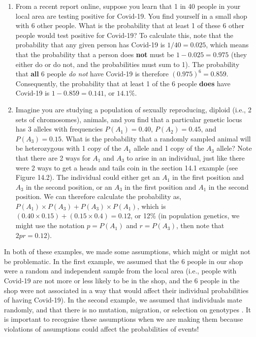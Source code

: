\documentclass[
]{scrbook}
\begin{document}
\begin{enumerate}
\def\labelenumi{\arabic{enumi}.}
\item
  From a recent report online, suppose you learn that 1 in 40 people in your local area are testing positive for Covid-19. You find yourself in a small shop with 6 other people. What is the probability that at least 1 of these 6 other people would test positive for Covid-19? To calculate this, note that the probability that any given person has Covid-19 is \(1/40 = 0.025\), which means that the probability that a person does \textbf{not} must be \(1 - 0.025 = 0.975\) (they either do or do not, and the probabilities must sum to 1). The probability that \textbf{all} 6 people \emph{do not} have Covid-19 is therefore \((0.975)^6 = 0.859\). Consequently, the probability that at least 1 of the 6 people \textbf{does} have Covid-19 is \(1 - 0.859 = 0.141\), or \(14.1\%\).
\item
  Imagine you are studying a population of sexually reproducing, diploid (i.e., 2 sets of chromosomes), animals, and you find that a particular genetic locus has 3 alleles with frequencies \(P(A_{1}) = 0.40\), \(P(A_{2}) = 0.45\), and \(P(A_{3}) = 0.15\). What is the probability that a randomly sampled animal will be heterozygous with 1 copy of the \(A_{1}\) allele and 1 copy of the \(A_{3}\) allele? Note that there are 2 ways for \(A_{1}\) and \(A_{3}\) to arise in an individual, just like there were 2 ways to get a heads and tails coin in the section 14.1 example (see Figure 14.2). The individual could either get an \(A_{1}\) in the first position and \(A_{3}\) in the second position, or an \(A_{3}\) in the first position and \(A_{1}\) in the second position. We can therefore calculate the probability as, \(P(A_{1}) \times P(A_{3}) + P(A_{3}) \times P(A_{1})\), which is \((0.40 \times 0.15) + (0.15 \times 0.4) = 0.12\), or 12\% (in population genetics, we might use the notation \(p = P(A_{1})\) and \(r = P(A_{3})\), then note that \(2pr = 0.12\)).
\end{enumerate}

In both of these examples, we made some assumptions, which might or might not be problematic.
In the first example, we assumed that the 6 people in our shop were a random and independent sample from the local area (i.e., people with Covid-19 are not more or less likely to be in the shop, and the 6 people in the shop were not associated in a way that would affect their individual probabilities of having Covid-19).
In the second example, we assumed that individuals mate randomly, and that there is no mutation, migration, or selection on genotypes \citep{Hardy1908}.
It is important to recognise these assumptions when we are making them because violations of assumptions could affect the probabilities of events!
\end{document}
